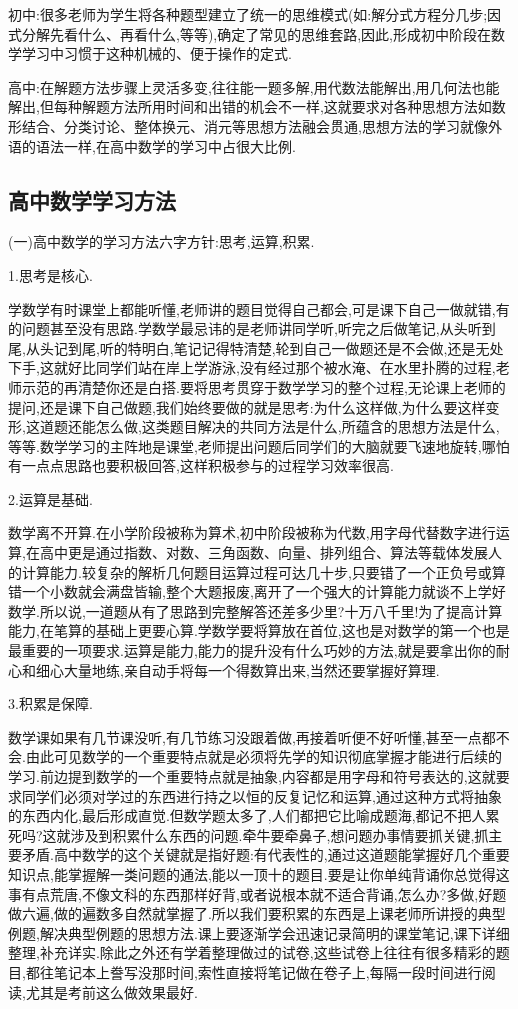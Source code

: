 初中:很多老师为学生将各种题型建立了统一的思维模式(如:解分式方程分几步;因式分解先看什么、再看什么,等等),确定了常见的思维套路,因此,形成初中阶段在数学学习中习惯于这种机械的、便于操作的定式.

高中:在解题方法步骤上灵活多变,往往能一题多解,用代数法能解出,用几何法也能解出,但每种解题方法所用时间和出错的机会不一样,这就要求对各种思想方法如数形结合、分类讨论、整体换元、消元等思想方法融会贯通,思想方法的学习就像外语的语法一样,在高中数学的学习中占很大比例.

\subsection{高中数学学习方法}
(一)高中数学的学习方法六字方针:思考,运算,积累.

1.思考是核心.

学数学有时课堂上都能听懂,老师讲的题目觉得自己都会,可是课下自己一做就错,有的问题甚至没有思路.学数学最忌讳的是老师讲同学听,听完之后做笔记,从头听到尾,从头记到尾,听的特明白,笔记记得特清楚,轮到自己一做题还是不会做,还是无处下手,这就好比同学们站在岸上学游泳,没有经过那个被水淹、在水里扑腾的过程,老师示范的再清楚你还是白搭.要将思考贯穿于数学学习的整个过程,无论课上老师的提问,还是课下自己做题,我们始终要做的就是思考:为什么这样做,为什么要这样变形,这道题还能怎么做,这类题目解决的共同方法是什么,所蕴含的思想方法是什么,等等.数学学习的主阵地是课堂,老师提出问题后同学们的大脑就要飞速地旋转,哪怕有一点点思路也要积极回答,这样积极参与的过程学习效率很高.

2.运算是基础.

数学离不开算.在小学阶段被称为算术,初中阶段被称为代数,用字母代替数字进行运算,在高中更是通过指数、对数、三角函数、向量、排列组合、算法等载体发展人的计算能力.较复杂的解析几何题目运算过程可达几十步,只要错了一个正负号或算错一个小数就会满盘皆输,整个大题报废,离开了一个强大的计算能力就谈不上学好数学.所以说,一道题从有了思路到完整解答还差多少里?十万八千里!为了提高计算能力,在笔算的基础上更要心算.学数学要将算放在首位,这也是对数学的第一个也是最重要的一项要求.运算是能力,能力的提升没有什么巧妙的方法,就是要拿出你的耐心和细心大量地练,亲自动手将每一个得数算出来,当然还要掌握好算理.

3.积累是保障.

数学课如果有几节课没听,有几节练习没跟着做,再接着听便不好听懂,甚至一点都不会.由此可见数学的一个重要特点就是必须将先学的知识彻底掌握才能进行后续的学习.前边提到数学的一个重要特点就是抽象,内容都是用字母和符号表达的,这就要求同学们必须对学过的东西进行持之以恒的反复记忆和运算,通过这种方式将抽象的东西内化,最后形成直觉.但数学题太多了,人们都把它比喻成题海,都记不把人累死吗?这就涉及到积累什么东西的问题.牵牛要牵鼻子,想问题办事情要抓关键,抓主要矛盾.高中数学的这个关键就是指好题:有代表性的,通过这道题能掌握好几个重要知识点,能掌握解一类问题的通法,能以一顶十的题目.要是让你单纯背诵你总觉得这事有点荒唐,不像文科的东西那样好背,或者说根本就不适合背诵,怎么办?多做,好题做六遍,做的遍数多自然就掌握了.所以我们要积累的东西是上课老师所讲授的典型例题,解决典型例题的思想方法.课上要逐渐学会迅速记录简明的课堂笔记,课下详细整理,补充详实.除此之外还有学着整理做过的试卷,这些试卷上往往有很多精彩的题目,都往笔记本上誊写没那时间,索性直接将笔记做在卷子上,每隔一段时间进行阅读,尤其是考前这么做效果最好.

